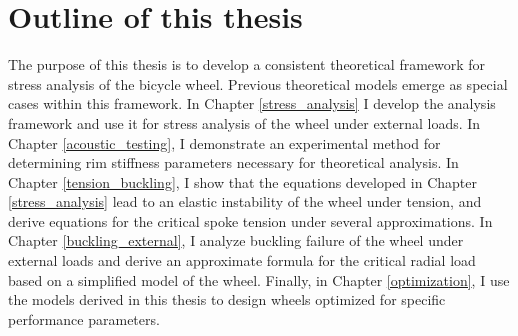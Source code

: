 \documentclass[../thesis.tex]{subfiles}
\begin{document}
\section{Outline of this thesis}

The purpose of this thesis is to develop a consistent theoretical framework for stress analysis of the bicycle wheel. Previous theoretical models emerge as special cases within this framework. In Chapter \ref{stress_analysis} I develop the analysis framework and use it for stress analysis of the wheel under external loads. In Chapter \ref{acoustic_testing}, I demonstrate an experimental method for determining rim stiffness parameters necessary for theoretical analysis. In Chapter \ref{tension_buckling}, I show that the equations developed in Chapter \ref{stress_analysis} lead to an elastic instability of the wheel under tension, and derive equations for the critical spoke tension under several approximations. In Chapter \ref{buckling_external}, I analyze buckling failure of the wheel under external loads and derive an approximate formula for the critical radial load based on a simplified model of the wheel. Finally, in Chapter \ref{optimization}, I use the models derived in this thesis to design wheels optimized for specific performance parameters.
\end{document}
